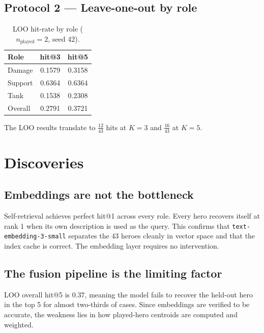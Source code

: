 \documentclass[11pt, a4paper]{article}
\begin{document}
\subsection{Protocol 2 — Leave-one-out by role}

\begin{table}[h]
\centering
\caption{LOO hit-rate by role ($n_\text{played}=2$, seed 42).}
\begin{tabular}{lcc}
\toprule
Role    & hit@3  & hit@5  \\
\midrule
Damage  & \textcolor{bad}{0.1579} & \textcolor{mid}{0.3158} \\
Support & \textcolor{good}{0.6364} & \textcolor{good}{0.6364} \\
Tank    & \textcolor{bad}{0.1538} & \textcolor{bad}{0.2308} \\
\midrule
Overall & \textcolor{mid}{0.2791} & \textcolor{mid}{0.3721} \\
\bottomrule
\end{tabular}
\end{table}

\noindent
The LOO results translate to $\frac{12}{43}$ hits at $K=3$ and $\frac{16}{43}$
at $K=5$.

\section{Discoveries}

\subsection{Embeddings are not the bottleneck}

Self-retrieval achieves perfect hit@1 across every role.  Every hero recovers
itself at rank 1 when its own description is used as the query.  This confirms
that \texttt{text-embedding-3-small} separates the 43 heroes cleanly in vector
space and that the index cache is correct.  The embedding layer requires no
intervention.

\subsection{The fusion pipeline is the limiting factor}

LOO overall hit@5 is $0.37$, meaning the model fails to recover the held-out
hero in the top 5 for almost two-thirds of cases.  Since embeddings are
verified to be accurate, the weakness lies in how played-hero centroids are
computed and weighted.
\end{document}
